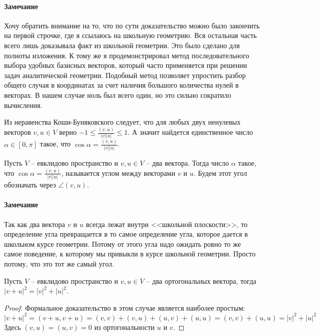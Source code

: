 \paragraph{Замечание} 

Хочу обратить внимание на то, что по сути доказательство можно было закончить на первой строчке, где я ссылаюсь  на школьную геометрию.
Вся остальная часть всего лишь доказывала факт из школьной геометрии.
Это было сделано для полноты изложения.
К тому же я продемонстрировал метод последовательного выбора удобных базисных векторов, который часто применяется при решении задач аналитической геометрии.
Подобный метод позволяет упростить разбор общего случая в координатах за счет наличия большого количества нулей в векторах.
В нашем случае ноль был всего один, но это сильно сократило вычисления.

Из неравенства Коши-Буняковского следует, что для любых двух ненулевых векторов $v,u\in V$ верно $-1\leqslant \frac{(v,u)}{|v| |u|}\leqslant 1$.
А значит найдется единственное число $\alpha\in [0,\pi]$ такое, что $\cos \alpha = \frac{(v,u)}{|v| |u|}$.

\begin{definition}
Пусть $V$ -- евклидово пространство и $v,u\in V$ -- два вектора.
Тогда число $\alpha$ такое, что $\cos \alpha = \frac{(v,u)}{|v| |u|}$, называется углом между векторами $v$ и $u$.
Будем этот угол обозначать через $\angle(v, u)$.
\end{definition}

\paragraph{Замечание}

Так как два вектора $v$ и $u$ всегда лежат внутри <<школьной плоскости>>, то определение угла превращается в то самое определение угла, которое дается в школьном курсе геометрии.
Потому от этого угла надо ожидать ровно то же самое поведение, к которому мы привыкли в курсе школьной геометрии.
Просто потому, что это тот же самый угол.


\begin{claim}
\label{claim::Pythagoras}
Пусть $V$ -- евклидово пространство и $v,u\in V$ -- два ортогональных вектора, тогда $|v + u|^2 = |v|^2 + |u|^2$.
\end{claim}
\begin{proof}
Формальное доказательство в этом случае является наиболее простым:
\[
|v+u|^2 = (v+u, v+u) = (v,v) + (v,u)+(u,v) +(u,u) = (v,v) + (u,u) = |v|^2 + |u|^2
\]
Здесь $(v,u)=(u,v) = 0$ из ортогональности $u$ и $v$.
\end{proof}

